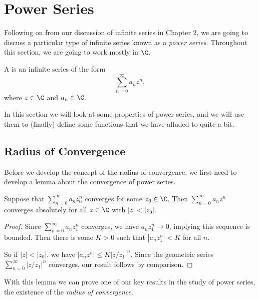 \documentclass[a4paper]{scrartcl}
\begin{document}
\clearpage
\section{Power Series}

Following on from our discussion of infinite series in Chapter 2, we are going to discuss a particular type of infinite series known as a \emph{power series}. Throughout this section, we are going to work mostly in $\C$.

\begin{definition}
	A  is an infinite series of the form
	$$
		\sum_{n = 0}^{\infty} a_n z^n,
	$$
	where $z \in \C$ and $a_n \in \C$.
\end{definition}

In this section we will look at some properties of power series, and we will use them to (finally) define some functions that we have alluded to quite a bit.

\subsection{Radius of Convergence}

Before we develop the concept of the radius of convergence, we first need to develop a lemma about the convergence of power series. 

\begin{lemma}
Suppose that $\sum_{n = 0}^{\infty} a_n z_0^n$ converges for some $z_0 \in \C$. Then $\sum_{n = 0}^{\infty} a_n z^n$ converges absolutely for all $z\in \C$ with $|z| < |z_0|$.
\end{lemma}
\begin{proof}
Since $\sum_{n = 0}^{\infty} a_n z_1^n$ converges, we have $a_n z_1^n \rightarrow 0$, implying this sequence is bounded.
Then there is some $K > 0$ such that $|a_n z_1^n| < K$ for all $n$.	

So if $|z| < |z_0|$, we have $|a_n z^n| \leq K \left|z/z_1\right|^n$. Since the geometric series $\sum_{n = 0}^{\infty} |z/z_1|^n$ converges, our result follows by comparison.
\end{proof}

With this lemma we can prove one of our key results in the study of power series, the existence of the \emph{radius of convergence}.
\end{document}

